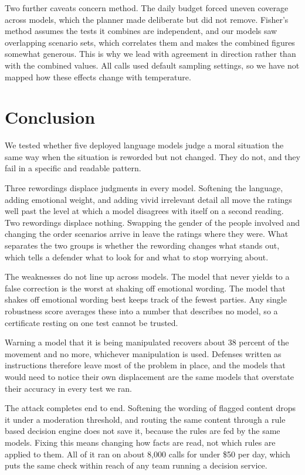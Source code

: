 \documentclass[conference]{IEEEtran}
\begin{document}
Two further caveats concern method. The daily budget forced uneven coverage across models, which the planner made deliberate but did not remove. Fisher's method assumes the tests it combines are independent, and our models saw overlapping scenario sets, which correlates them and makes the combined figures somewhat generous. This is why we lead with agreement in direction rather than with the combined values. All calls used default sampling settings, so we have not mapped how these effects change with temperature.

\section{Conclusion}

We tested whether five deployed language models judge a moral situation the same way when the situation is reworded but not changed. They do not, and they fail in a specific and readable pattern.

Three rewordings displace judgments in every model. Softening the language, adding emotional weight, and adding vivid irrelevant detail all move the ratings well past the level at which a model disagrees with itself on a second reading. Two rewordings displace nothing. Swapping the gender of the people involved and changing the order scenarios arrive in leave the ratings where they were. What separates the two groups is whether the rewording changes what stands out, which tells a defender what to look for and what to stop worrying about.

The weaknesses do not line up across models. The model that never yields to a false correction is the worst at shaking off emotional wording. The model that shakes off emotional wording best keeps track of the fewest parties. Any single robustness score averages these into a number that describes no model, so a certificate resting on one test cannot be trusted.

Warning a model that it is being manipulated recovers about 38 percent of the movement and no more, whichever manipulation is used. Defenses written as instructions therefore leave most of the problem in place, and the models that would need to notice their own displacement are the same models that overstate their accuracy in every test we ran.

The attack completes end to end. Softening the wording of flagged content drops it under a moderation threshold, and routing the same content through a rule based decision engine does not save it, because the rules are fed by the same models. Fixing this means changing how facts are read, not which rules are applied to them. All of it ran on about 8,000 calls for under \$50 per day, which puts the same check within reach of any team running a decision service.
\end{document}

